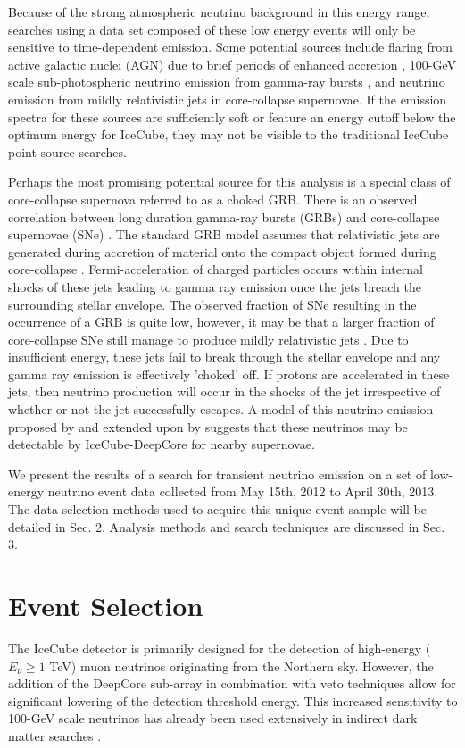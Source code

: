 \documentclass[manuscript]{aastex}
\begin{document}
Because of the strong atmospheric neutrino background in this energy range, searches using a data set composed of these low energy events will only be sensitive to time-dependent emission. Some potential sources include flaring from active galactic nuclei (AGN) due to brief periods of enhanced accretion \cite{?}, 100-GeV scale sub-photospheric neutrino emission from gamma-ray bursts \cite{?}, and neutrino emission from mildly relativistic jets in core-collapse supernovae. If the emission spectra for these sources are sufficiently soft or feature an energy cutoff below the optimum energy for IceCube, they may not be visible to the traditional IceCube point source searches.

Perhaps the most promising potential source for this analysis is a special class of core-collapse supernova referred to as a choked GRB. There is an observed correlation between long duration gamma-ray bursts (GRBs) and core-collapse supernovae (SNe) \cite{?}.  The standard GRB model assumes that relativistic jets are generated during accretion of material onto the compact object formed during core-collapse \cite{?}. Fermi-acceleration of charged particles occurs within internal shocks of these jets leading to gamma ray emission once the jets breach the surrounding stellar envelope.  The observed fraction of SNe resulting in the occurrence of a GRB is quite low, however, it may be that a larger fraction of core-collapse SNe still manage to produce mildly relativistic jets \cite{?}.  Due to insufficient energy, these jets fail to break through the stellar envelope and any gamma ray emission is effectively 'choked' off. If protons are accelerated in these jets, then neutrino production will occur in the shocks of the jet irrespective of whether or not the jet successfully escapes. A model of this neutrino emission proposed by \cite{2004PhRvL..93r1101R} and extended upon by \cite{2005PhRvL..95f1103A} suggests that these neutrinos may be detectable by IceCube-DeepCore for nearby supernovae.

We present the results of a search for transient neutrino emission on a set of low-energy neutrino event data collected from May 15th, 2012 to April 30th, 2013. The data selection methods used to acquire this unique event sample will be detailed in Sec. 2. Analysis methods and search techniques are discussed in Sec. 3. 
\section{Event Selection}
The IceCube detector is primarily designed for the detection of high-energy ($E_{\nu} \geq 1$ TeV) muon neutrinos originating from the Northern sky. However, the addition of the DeepCore sub-array in combination with veto techniques allow for significant lowering of the detection threshold energy. This increased sensitivity to 100-GeV scale neutrinos has already been used extensively in indirect dark matter searches \cite{}.
\end{document}
